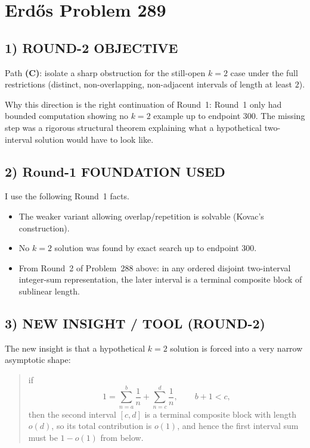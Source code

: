 \section{Erd\H{o}s Problem 289}

\subsection*{1) ROUND-2 OBJECTIVE}
Path \textbf{(C)}: isolate a sharp obstruction for the still-open $k=2$ case under the full restrictions (distinct, non-overlapping, non-adjacent intervals of length at least $2$).

Why this direction is the right continuation of Round~1: Round~1 only had bounded computation showing no $k=2$ example up to endpoint $300$. The missing step was a rigorous structural theorem explaining what a hypothetical two-interval solution would have to look like.

\subsection*{2) Round-1 FOUNDATION USED}
I use the following Round~1 facts.

\begin{itemize}
	\item[(F1)] The weaker variant allowing overlap/repetition is solvable (Kovac's construction).
	\item[(F2)] No $k=2$ solution was found by exact search up to endpoint $300$.
	\item[(F3)] From Round~2 of Problem~288 above: in any ordered disjoint two-interval integer-sum representation, the later interval is a terminal composite block of sublinear length.
\end{itemize}

\subsection*{3) NEW INSIGHT / TOOL (ROUND-2)}
The new insight is that a hypothetical $k=2$ solution is forced into a very narrow asymptotic shape:

\begin{quote}
	if
	\[
	1=\sum_{n=a}^b\frac1n+\sum_{n=c}^d\frac1n,
	\qquad b+1<c,
	\]
	then the second interval $[c,d]$ is a terminal composite block with length $o(d)$, so its total contribution is $o(1)$, and hence the first interval sum must be $1-o(1)$ from below.
\end{quote}

